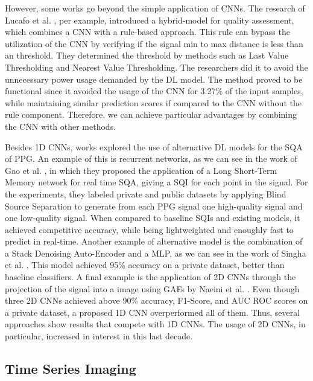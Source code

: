 However, some works go beyond the simple application of \gls{CNN}s. The research of Lucafo et al. \cite{deep-learning-3}, per example, introduced a hybrid-model for quality assessment, which combines a \gls{CNN} with a rule-based approach. This rule can bypass the utilization of the \gls{CNN} by verifying if the signal min to max distance is less than an threshold. They determined the threshold by methods such as Last Value Thresholding and Nearest Value Thresholding. The researchers did it to avoid the unnecessary power usage demanded by the \gls{DL} model. The method proved to be functional since it avoided the usage of the \gls{CNN} for 3.27\% of the input samples, while maintaining similar prediction scores if compared to the \gls{CNN} without the rule component. Therefore, we can achieve particular advantages by combining the \gls{CNN} with other methods.  

Besides 1D \gls{CNN}s, works explored the use of alternative \gls{DL} models for the \gls{SQA} of \gls{PPG}. An example of this is recurrent networks, as we can see in the work of Gao et al. \cite{deep-learning-4}, in which they proposed the application of a Long Short-Term Memory network for real time \gls{SQA}, giving a \gls{SQI} for each point in the signal. For the experiments, they labeled private and public datasets by applying Blind Source Separation to generate from each \gls{PPG} signal one high-quality signal and one low-quality signal. When compared to baseline \gls{SQI}s and existing models, it achieved competitive accuracy, while being lightweighted and enoughly fast to predict in real-time. Another example of alternative model is the combination of a Stack Denoising Auto-Encoder and a \gls{MLP}, as we can see in the work of Singha et al. \cite{deep-learning-5}. This model achieved 95\% accuracy on a private dataset, better than baseline classifiers. A final example is the application of 2D \glspl{CNN} through the projection of the signal into a image using \glspl{GAF} by Naeini et al. \cite{deep-learning-6}. Even though three 2D \glspl{CNN} achieved above 90\% accuracy, F1-Score, and \gls{AUC} \gls{ROC} scores on a private dataset, a proposed 1D \gls{CNN} overperformed all of them. Thus, several approaches show results that compete with 1D \glspl{CNN}. The usage of 2D \glspl{CNN}, in particular, increased in interest in this last decade.




\subsection{Time Series Imaging}
\label{sec:imaging}

